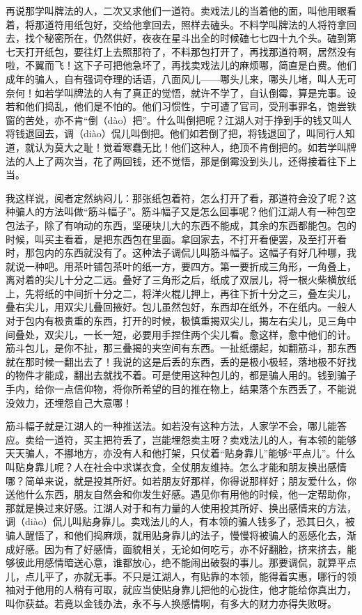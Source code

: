 \documentclass[12pt,UTF8]{ctexbook}
\begin{document}
再说那学叫牌法的人，二次又求他们一道符。卖戏法儿的当着他的面，叫他用眼看着，将那道符用纸包好，交给他拿回去，照样去磕头。不料学叫牌法的人将符拿回去，找个秘密所在，仍然供好，夜夜在星斗出全的时候磕七七四十九个头。磕到第七天打开纸包，要往灯上去照那符了，不料那包打开了，再找那道符啊，居然没有啦，不翼而飞！这下子可把他急坏了，再找卖戏法儿的麻烦哪，简直是白费。他们成年的骗人，自有强词夺理的话语，八面风儿——哪头儿来，哪头儿堵，叫人无可奈何！如若学叫牌法的人有了真正的觉悟，就许不学了，自认倒霉，算是完事。设若和他们捣乱，他们是不怕的。他们习惯性，宁可遭了官司，受刑事罪名，饱尝铁窗的苦处，亦不肯“倒（dào）把”。什么叫倒把呢？江湖人对于挣到手的钱又叫人将钱退回去，调（diào）侃儿叫倒把。他们如若倒了把，将钱退回了，叫同行人知道，就认为莫大之耻！觉着寒蠢无比！他们这种人，绝顶不肯倒把的。如若学叫牌法的人上了两次当，花了两回钱，还不觉悟，那是倒霉没到头儿，还得接着往下上当。

我这样说，阅者定然纳闷儿：那张纸包着符，怎么打开了看，那道符会没了呢？这种骗人的方法叫做“筋斗幅子”。筋斗幅子又是怎么回事呢？他们江湖人有一种包空包法子，除了有响动的东西，坚硬块儿大的东西不能成，其余的东西都能包。包的时候，叫买主看着，是把东西包在里面。拿回家去，不打开看便罢，及至打开看时，那包内的东西就没有了。这种法子调侃儿叫筋斗幅子。这幅子有好几种哪，我就说一种吧。用茶叶铺包茶叶的纸一方，要四方。第一要折成三角形，一角叠上，离对着的尖儿十分之二远。叠好了三角形之后，纸成了双层儿，将一根火柴横放纸上，先将纸的中间折十分之二，将洋火棍儿押上，再往下折十分之三，叠左尖儿，叠右尖儿，用双尖儿叠回掖好。包儿虽然包好，东西却在纸外，不在纸内。一般人对于包内有极贵重的东西，打开的时候，极慎重揭双尖儿，揭左右尖儿，见三角中间叠处，双尖儿，一长一短，必要用手捏住两个尖儿看。愈这样，愈中他们的计。筋斗包儿，是你不扯，那三叠揭的夹空间有东西。一扯纸绷起，如翻筋斗，那东西就在那时候一翻出去了！我说的这是后丢的东西，丢的是极小极轻，落地极不好找的物件才能成，翻出去就找不着。可是使用这种包儿的，都是骗人用的。钱到骗子手内，给你一点信仰物，将你所希望的目的推在物上，结果落个东西丢了，不能说没效力，还埋怨自己大意哪！

筋斗幅子就是江湖人的一种推送法。如若没有这种方法，人家学不会，哪儿能答应。卖给一道符，买主把符丢了，岂能埋怨卖主呀？卖戏法儿的人，有本领的能够天天骗人，不挪地方，亦没有人和他打架，只仗着“贴身靠儿”能够“平点儿”。什么叫贴身靠儿呢？人在社会中求谋衣食，全仗朋友维持。怎么才能和朋友换出感情哪？简单来说，就是投其所好。如若朋友好那样，你得说那样好；朋友爱什么，你送他什么东西，朋友自然会和你发生好感。遇见你有用他的时候，他一定帮助你，那就是换过来好感。江湖人对于和有力量的人使用投其所好、换出感情来的方法，调（diào）侃儿叫贴身靠儿。卖戏法儿的人，有本领的骗人钱多了，恐其日久，被骗人醒悟了，和他们捣麻烦，就用贴身靠儿的法子，慢慢将被骗人的恶感化去，渐成好感。因为有了好感情，面貌相关，无论如何吃亏，亦不好翻脸，挤来挤去，能够彼此用感情暗送心意，谁都放心，绝不能闹出破裂的事儿。那要调侃，就算平点儿，点儿平了，亦就无事。不只是江湖人，有贴靠的本领，能得着实惠，哪行的领袖对于他用的人稍有可取，就应当使贴身靠儿把他的心拢住，他才能给你真出力，叫你获益。若竟以金钱办法，永不与人换感情啊，有多大的财力亦得失败呀。
\end{document}
